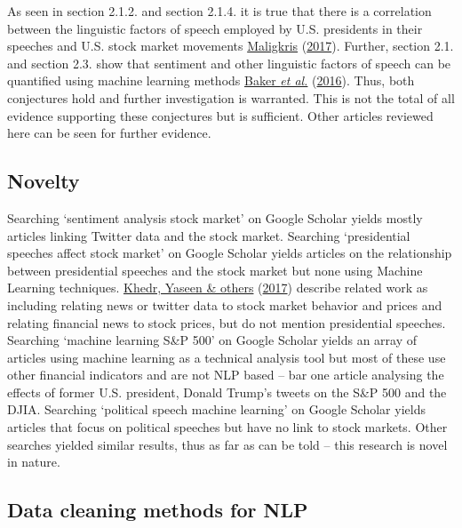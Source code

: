 \documentclass[11pt,preprint, authoryear]{elsarticle}
\numberwithin{equation}{section}
\numberwithin{figure}{section}
\numberwithin{table}{section}
\begin{document}
As seen in section 2.1.2. and section 2.1.4. it is true that there is a
correlation between the linguistic factors of speech employed by U.S.
presidents in their speeches and U.S. stock market movements
\protect\hyperlink{ref-maligkris2017political}{Maligkris}
(\protect\hyperlink{ref-maligkris2017political}{2017}). Further, section
2.1. and section 2.3. show that sentiment and other linguistic factors
of speech can be quantified using machine learning methods
\protect\hyperlink{ref-baker2016measuring}{Baker \emph{et al.}}
(\protect\hyperlink{ref-baker2016measuring}{2016}). Thus, both
conjectures hold and further investigation is warranted. This is not the
total of all evidence supporting these conjectures but is sufficient.
Other articles reviewed here can be seen for further evidence.

\hypertarget{novelty}{%
\subsection{\texorpdfstring{Novelty
\label{novelty}}{Novelty }}\label{novelty}}

Searching `sentiment analysis stock market' on Google Scholar yields
mostly articles linking Twitter data and the stock market. Searching
`presidential speeches affect stock market' on Google Scholar yields
articles on the relationship between presidential speeches and the stock
market but none using Machine Learning techniques.
\protect\hyperlink{ref-khedr2017predicting}{Khedr, Yaseen \& others}
(\protect\hyperlink{ref-khedr2017predicting}{2017}) describe related
work as including relating news or twitter data to stock market behavior
and prices and relating financial news to stock prices, but do not
mention presidential speeches. Searching `machine learning S\&P 500' on
Google Scholar yields an array of articles using machine learning as a
technical analysis tool but most of these use other financial indicators
and are not NLP based -- bar one article analysing the effects of former
U.S. president, Donald Trump's tweets on the S\&P 500 and the DJIA.
Searching `political speech machine learning' on Google Scholar yields
articles that focus on political speeches but have no link to stock
markets. Other searches yielded similar results, thus as far as can be
told -- this research is novel in nature.

\hypertarget{data-cleaning-methods-for-nlp}{%
\subsection{\texorpdfstring{Data cleaning methods for NLP
\label{data cleaning}}{Data cleaning methods for NLP }}\label{data-cleaning-methods-for-nlp}}
\end{document}
